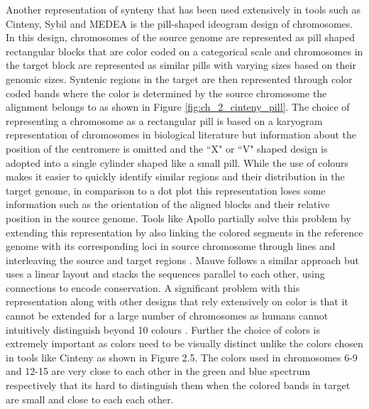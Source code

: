 Another representation of synteny that has been used extensively in tools such as Cinteny\cite{sinha2007cinteny}, Sybil\cite{crabtree2007sybil} and MEDEA\cite{nusrat2019tasks} is the pill-shaped ideogram design of chromosomes. In this design, chromosomes of the source genome are represented as pill shaped rectangular blocks that are color coded on a categorical scale and chromosomes in the target block are represented as similar pills with varying sizes based on their genomic sizes. Syntenic regions in the target are then represented through color coded bands where the color is determined by the source chromosome the alignment belongs to as shown in Figure \ref{fig:ch_2_cinteny_pill}.
The choice of representing a chromosome as a rectangular pill is based on a karyogram representation of chromosomes in biological literature but information about the position of the centromere is omitted and the ``X" or ``V" shaped design is adopted into a single cylinder shaped like a small pill. While the use of colours makes it easier to quickly identify similar regions and their distribution in the target genome, in comparison to a dot plot this representation loses some information such as the orientation of the aligned blocks and their relative position in the source genome. Tools like Apollo partially solve this problem by extending this representation by also linking the colored segments in the reference genome with its corresponding loci in source chromosome through lines and interleaving the source and target regions \cite{lee2009apollo}. Mauve follows a similar approach but uses a linear layout and stacks the sequences parallel to each other, using connections to encode conservation\cite{darling2004mauve}. A significant problem with this representation along with other designs that rely extensively on color is that it cannot be extended for a large number of chromosomes as humans cannot intuitively distinguish beyond 10 colours \cite{tufte1990envisioning}. Further the choice of colors is extremely important as colors need to be visually distinct unlike the colors chosen in tools like Cinteny\cite{sinha2007cinteny} as shown in Figure 2.5. The colors used in chromosomes 6-9 and 12-15 are very close to each other in the green and blue spectrum respectively that its hard to distinguish them when the colored bands in target are small and close to each each other. 


